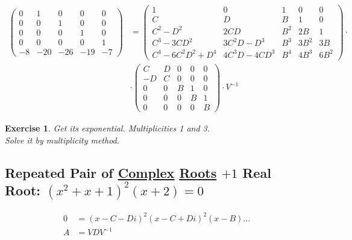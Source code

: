 \documentclass[12pt,a4paper]{article}
\newtheorem{exercise}{Exercise}[section]
\begin{document}
\begin{align}
\left( \begin{matrix} 0&1&0&0&0 \\ 0&0&1&0&0 \\ 0&0&0&1&0 \\ 0&0&0&0&1 \\ -8 & -20 & -26 & -19 & -7 \end{matrix} \right)
&=
\left( \begin{matrix} 1&0&1&0&0 \\ C&D&B&1&0 \\ C^2-D^2&2CD&B^2&2B&1 \\ C^3-3CD^2&3C^2D-D^3&B^3&3B^2&3B \\ C^4-6C^2D^2+D^4&4C^3D-4CD^3&B^4&4B^3&6B^2 \end{matrix} \right) \cdot \nonumber \\
&\cdot \left( \begin{matrix} C & D&0&0&0 \\ -D & C&0&0&0 \\ 0 & 0 & B & 1 & 0 \\ 0 & 0 & 0 & B & 1 \\ 0 & 0 & 0 & 0 & B \end{matrix} \right) \cdot V^{-1}
\end{align}

\begin{exercise}
Get its exponential. Multiplicities 1 and 3.\\
Solve it by multiplicity method.
\end{exercise}

\subsection{Repeated Pair of \href{https://www.wolframalpha.com/input/?i=(x+\%5E2+\%2B+x+\%2B1)\%5E2+*(x-2)+\%3D+0}{\color{blue}\underline{Complex}} \href{}{Roots} $+ 1$ Real Root: $(x^2 + x + 1)^2(x + 2) = 0$}

\begin{align}
0 &= (x - C - Di)^2(x - C + Di)^2(x - B) ... \\
A &= VDV^{-1}
\end{align}
\end{document}
